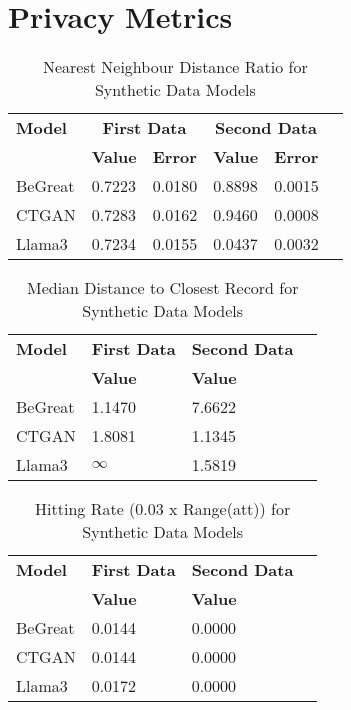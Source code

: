 \chapter*{Privacy Metrics}
\label{app:privacy_metrics_appendix}

\begin{table}[H]
    \centering
    \caption{Nearest Neighbour Distance Ratio for Synthetic Data Models}
    \label{tab:nn_distance_ratio_combined}
    \begin{tabularx}{\textwidth}{l*{5}{X}}
        \toprule
        \textbf{Model} & \multicolumn{2}{c}{\textbf{First Data}} & \multicolumn{2}{c}{\textbf{Second Data}} \\
        \cmidrule(lr){2-3} \cmidrule(lr){4-5}
        & \textbf{Value} & \textbf{Error} & \textbf{Value} & \textbf{Error} \\
        \midrule
        BeGreat & 0.7223 & 0.0180 & 0.8898 & 0.0015 \\
        CTGAN & 0.7283 & 0.0162 & 0.9460 & 0.0008 \\
        Llama3 & 0.7234 & 0.0155 & 0.0437 & 0.0032 \\
        \bottomrule
    \end{tabularx}
\end{table}


\begin{table}[H]
    \centering
    \caption{Median Distance to Closest Record for Synthetic Data Models}
    \label{tab:median_distance_combined}
    \begin{tabularx}{\textwidth}{l*{5}{X}}
        \toprule
        \textbf{Model} & \multicolumn{2}{c}{\textbf{First Data}} & \multicolumn{2}{c}{\textbf{Second Data}} \\
        \cmidrule(lr){2-3} \cmidrule(lr){4-5}
        & \textbf{Value} & & \textbf{Value} \\
        \midrule
        BeGreat & 1.1470 & & 7.6622 \\
        CTGAN & 1.8081 & & 1.1345 \\
        Llama3 & \(\infty\) & & 1.5819 \\
        \bottomrule
    \end{tabularx}
\end{table}
    

\begin{table}[H]
    \centering
    \caption{Hitting Rate (0.03 x Range(att)) for Synthetic Data Models}
    \label{tab:hitting_rate_combined}
    \begin{tabularx}{\textwidth}{l*{5}{X}}
        \toprule
        \textbf{Model} & \multicolumn{2}{c}{\textbf{First Data}} & \multicolumn{2}{c}{\textbf{Second Data}} \\
        \cmidrule(lr){2-3} \cmidrule(lr){4-5}
        & \textbf{Value} & & \textbf{Value} \\
        \midrule
        BeGreat & 0.0144 & & 0.0000 \\
        CTGAN & 0.0144 & & 0.0000 \\
        Llama3 & 0.0172 & & 0.0000 \\
        \bottomrule
    \end{tabularx}
\end{table}


